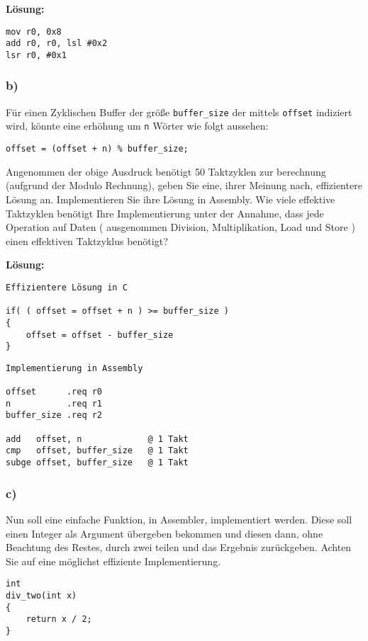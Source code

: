 \documentclass[12pt]{article}
\begin{document}
\textbf{Lösung:}
\begin{lstlisting}
mov r0, 0x8
add r0, r0, lsl #0x2
lsr r0, #0x1
\end{lstlisting}

\subsubsection{b)}
Für einen Zyklischen Buffer der größe \texttt{buffer\_size} der mittels
\texttt{offset} indiziert wird, könnte eine erhöhung um \texttt{n} Wörter wie
folgt aussehen:

\begin{lstlisting}
offset = (offset + n) % buffer_size;
\end{lstlisting}

Angenommen der obige Ausdruck benötigt 50 Taktzyklen zur berechnung (aufgrund
der Modulo Rechnung), geben Sie
eine, ihrer Meinung nach, effizientere Lösung an. Implementieren Sie ihre Lösung
in Assembly. Wie viele effektive Taktzyklen benötigt Ihre Implementierung unter
der Annahme, dass jede Operation auf Daten ( ausgenommen Division,
Multiplikation, Load und Store ) einen effektiven Taktzyklus benötigt?

\textbf{Lösung:}
\begin{lstlisting}
Effizientere Lösung in C

if( ( offset = offset + n ) >= buffer_size )
{
    offset = offset - buffer_size 
}
\end{lstlisting}

\begin{lstlisting}
Implementierung in Assembly

offset      .req r0
n           .req r1
buffer_size .req r2

add   offset, n             @ 1 Takt
cmp   offset, buffer_size   @ 1 Takt
subge offset, buffer_size   @ 1 Takt
\end{lstlisting}

\subsubsection{c)}
Nun soll eine einfache Funktion, in Assembler, implementiert werden. Diese soll einen Integer als Argument übergeben bekommen
und diesen dann, ohne Beachtung des Restes, durch zwei teilen und das Ergebnis zurückgeben. Achten Sie auf eine möglichst effiziente
Implementierung.

\begin{lstlisting}
int 
div_two(int x)
{
	return x / 2;
}
\end{lstlisting}
\end{document}
